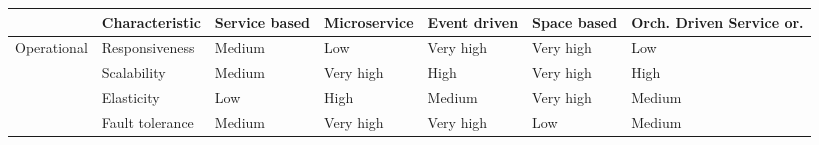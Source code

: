 \begin{table}[h!]
  \renewcommand{\arraystretch}{1.3}
  \centering
  \begin{tabularx}{\textwidth}{l l X X X X X}
    \toprule
     & \textbf{Characteristic} & \textbf{Service based} & \textbf{Microservice} & \textbf{Event driven} & \textbf{Space based} & \textbf{Orch. Driven Service or.} \\
    \midrule
    \multirow{4}{*}{Operational}
     & Responsiveness          & Medium                 & Low                   & Very high             & Very high            & Low                               \\
     & Scalability             & Medium                 & Very high             & High                  & Very high            & High                              \\
     & Elasticity              & Low                    & High                  & Medium                & Very high            & Medium                            \\
     & Fault tolerance         & Medium                 & Very high             & Very high             & Low                  & Medium                            \\
    \bottomrule
  \end{tabularx}
\end{table}




























